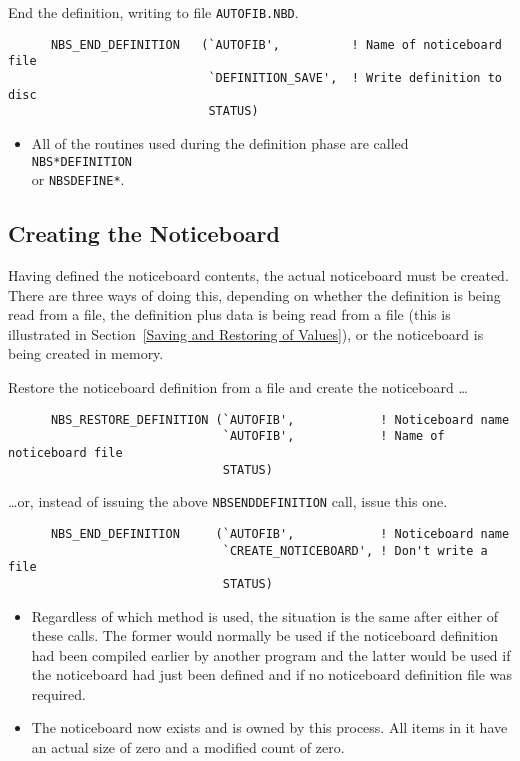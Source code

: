 \documentclass[twoside,11pt]{article}
\renewcommand{\_}{\texttt{\symbol{95}}}
\begin{document}
End the definition, writing to file {\tt AUTOFIB.NBD}.

\begin {verbatim}
      NBS_END_DEFINITION   (`AUTOFIB',          ! Name of noticeboard file
                            `DEFINITION_SAVE',  ! Write definition to disc
                            STATUS)
\end{verbatim}

\begin {itemize}
\item All of the routines used during the definition phase are called
{\tt NBS\_*\_DEFINITION} \\
or {\tt NBS\_DEFINE\_*}.
\end {itemize}

\subsection {Creating the Noticeboard}

Having defined the noticeboard contents, the actual noticeboard must be
created. There are three ways of doing this, depending on whether the
definition is being read from a file, the definition plus data is being read
from a file (this is illustrated in Section~\ref {Saving and Restoring of
Values}), or the noticeboard is being created in memory.

Restore the noticeboard definition from a file and create the noticeboard
\ldots

\begin {verbatim}
      NBS_RESTORE_DEFINITION (`AUTOFIB',            ! Noticeboard name
                              `AUTOFIB',            ! Name of noticeboard file
                              STATUS)
\end{verbatim}

\ldots or, instead of issuing the above {\tt NBS\_END\_DEFINITION} call, issue
this one.

\begin {verbatim}
      NBS_END_DEFINITION     (`AUTOFIB',            ! Noticeboard name
                              `CREATE_NOTICEBOARD', ! Don't write a file
                              STATUS)
\end{verbatim}

\begin {itemize}
\item Regardless of which method is used, the situation is the same after either
of these calls. The former would normally be used if the noticeboard definition
had been compiled earlier by another program and the latter would be used if
the noticeboard had just been defined and if no noticeboard definition file was
required.
\item The noticeboard now exists and is owned by this process. All items in it
have an actual size of zero and a modified count of zero.
\end {itemize}
\end{document}
